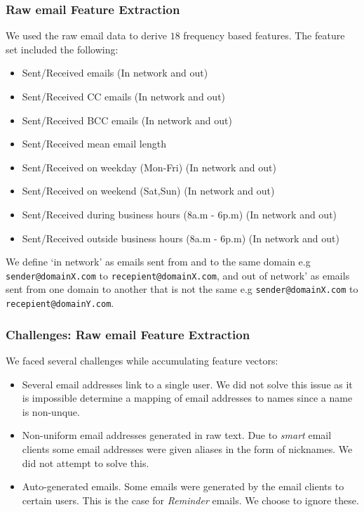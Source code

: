 \documentclass[11pt,letterpaper]{article}
\begin{document}
\subsubsection{Raw email Feature Extraction}
We used the raw email data to derive $18$ frequency based features. The feature set
included the following: 
\begin{itemize} \itemsep0em
\item Sent/Received emails (In network and out)
\item Sent/Received CC emails (In network and out)
\item Sent/Received BCC emails (In network and out)
\item Sent/Received mean email length
\item Sent/Received on weekday (Mon-Fri)  (In network and out)
\item Sent/Received on weekend (Sat,Sun)  (In network and out)
\item Sent/Received during business hours (8a.m - 6p.m) (In network and out)
\item Sent/Received outside business hours (8a.m - 6p.m) (In network and out)
\end{itemize}

We define `in network' as emails sent from and to the same domain e.g 
\texttt{sender@domainX.com} to \texttt{recepient@domainX.com}, and out of network'
as emails sent from one domain to another that is not the same e.g \texttt{sender@domainX.com}
to \texttt{recepient@domainY.com}.


\subsubsection{Challenges: Raw email Feature Extraction}
We faced several challenges while accumulating feature vectors:
\begin{itemize} \itemsep0em
\item Several email addresses link to a single user. We did not solve this issue as it is
impossible determine a mapping of email addresses to names since a name is non-unque.
\item Non-uniform email addresses generated in raw text. Due to \textit{smart} email clients
some email addresses were given aliases in the form of nicknames. We did not attempt to
solve this.
\item Auto-generated emails. Some emails were generated by the email clients to certain
users. This is the case for \textit{Reminder} emails. We choose to ignore these.
\end{itemize}
\end{document}
